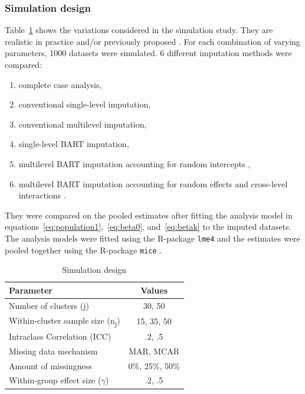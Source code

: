 \documentclass[10pt, a4paper, titlepage]{article}
\begin{document}
\subsubsection{Simulation design} 
Table~\ref{tab:simulationparameters} shows the variations considered in the simulation study. They are realistic in practice and/or previously proposed \citep{gulliford1999, murray2003, hox2017, grund2018, enders2018a, enders2020}. For each combination of varying parameters, 1000 datasets were simulated. 6 different imputation methods were compared: 
\begin{enumerate}
    \item complete case analysis,
    \item conventional single-level imputation,
    \item conventional multilevel imputation,
    \item single-level BART imputation,
    \item multilevel BART imputation accounting for random intercepts \citep{chen2020, wagner2020, tan2016},
    \item multilevel BART imputation accounting for random effects and cross-level interactions \citep{dorie2022}.
\end{enumerate} They were compared on the pooled estimates after fitting the analysis model in equations~\ref{eq:population1},~\ref{eq:beta0}, and~\ref{eq:betak} to the imputed datasets. The analysis models were fitted using the R-package \texttt{lme4} \citep{bates2015} and the estimates were pooled together using the R-package \texttt{mice} \citep{buuren2011}.
\begin{table}
\centering
\caption{Simulation design}
\label{tab:simulationparameters}
\begin{tabular}{l|c}
        \textbf{Parameter}                                  & \textbf{Values} \\ \hline
        Number of clusters (j)                              & 30, 50          \\
        Within-cluster sample size (n\textsubscript{j})     & 15, 35, 50   \\
        Intraclass Correlation (ICC)                        & .2, .5  \\
        Missing data mechanism                              & MAR, MCAR       \\
        Amount of missingness                               & 0\%, 25\%, 50\% \\
        Within-group effect size ($\gamma$)                 & .2, .5
\end{tabular}
\end{table} 
\end{document}
